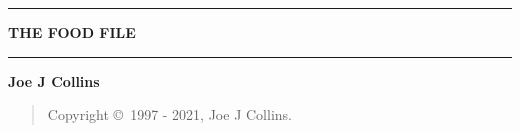 \documentclass{./FoodFile}
\begin{document}
\thispagestyle{empty}
\begin{center}
\hrule
\vspace{5mm}
{\Huge\bf THE FOOD FILE}
\vspace{5mm}
\hrule
\vfill
{\bf Joe J Collins}
\end{center}
\clearpage
\strut %
\vfill
\begin{quotation}
Copyright \copyright\ 1997 - 2021, Joe J Collins.
\end{quotation}
\clearpage
{}


\printindex
\end{document}
